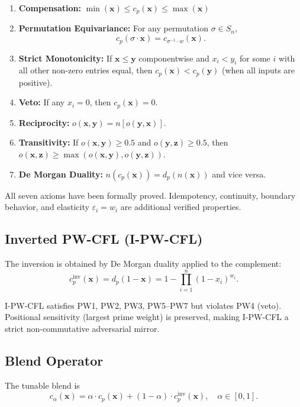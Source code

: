\documentclass[11pt,a4paper]{article}
\begin{document}
\begin{enumerate}[label=PW\arabic*.]
\item \textbf{Compensation:} \(\min(\mathbf{x}) \leq c_p(\mathbf{x}) \leq \max(\mathbf{x})\)
\item \textbf{Permutation Equivariance:} For any permutation \(\sigma \in S_n\),
      \[
      c_p(\sigma \cdot \mathbf{x}) = c_{\sigma^{-1} \cdot w}(\mathbf{x}).
      \]
\item \textbf{Strict Monotonicity:} If \(\mathbf{x} \leq \mathbf{y}\) componentwise and \(x_i < y_i\) for some \(i\) with all other non-zero entries equal, then \(c_p(\mathbf{x}) < c_p(\mathbf{y})\) (when all inputs are positive).
\item \textbf{Veto:} If any \(x_i = 0\), then \(c_p(\mathbf{x}) = 0\).
\item \textbf{Reciprocity:} \(o(\mathbf{x}, \mathbf{y}) = n[o(\mathbf{y}, \mathbf{x})]\).
\item \textbf{Transitivity:} If \(o(\mathbf{x}, \mathbf{y}) \geq 0.5\) and \(o(\mathbf{y}, \mathbf{z}) \geq 0.5\), then \(o(\mathbf{x}, \mathbf{z}) \geq \max(o(\mathbf{x}, \mathbf{y}), o(\mathbf{y}, \mathbf{z}))\).
\item \textbf{De Morgan Duality:} \(n(c_p(\mathbf{x})) = d_p(n(\mathbf{x}))\) and vice versa.
\end{enumerate}

All seven axioms have been formally proved. Idempotency, continuity, boundary behavior, and elasticity \(\varepsilon_i = w_i\) are additional verified properties.

\subsection{Inverted PW-CFL (I-PW-CFL)}

The inversion is obtained by De Morgan duality applied to the complement:
\[
c_p^{\text{inv}}(\mathbf{x}) = d_p(1 - \mathbf{x}) = 1 - \prod_{i=1}^n (1 - x_i)^{w_i}.
\]

I-PW-CFL satisfies PW1, PW2, PW3, PW5--PW7 but violates PW4 (veto). Positional sensitivity (largest prime weight) is preserved, making I-PW-CFL a strict non-commutative adversarial mirror.

\subsection{Blend Operator}

The tunable blend is
\[
c_\alpha(\mathbf{x}) = \alpha \cdot c_p(\mathbf{x}) + (1 - \alpha) \cdot c_p^{\text{inv}}(\mathbf{x}), \quad \alpha \in [0,1].
\]
\end{document}
